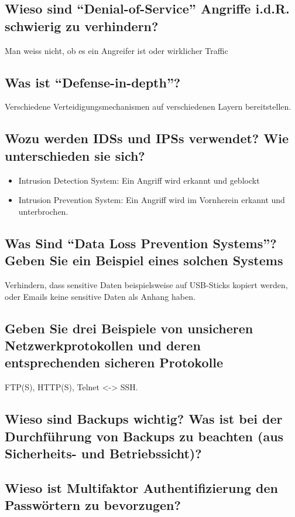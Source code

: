 \subsection*{Wieso sind "`Denial-of-Service"' Angriffe i.d.R. schwierig zu verhindern?}
Man weiss nicht, ob es ein Angreifer ist oder wirklicher Traffic

\subsection*{Was ist "`Defense-in-depth"'?}
Verschiedene Verteidigungsmechanismen auf verschiedenen Layern bereitstellen.

\subsection*{Wozu werden IDSs und IPSs verwendet? Wie unterschieden sie sich?}
\begin{itemize}
    \item Intrusion Detection System: Ein Angriff wird erkannt und geblockt
    \item Intrusion Prevention System: Ein Angriff wird im Vornherein erkannt und unterbrochen.
\end{itemize}

\subsection*{Was Sind "`Data Loss Prevention Systems"'? Geben Sie ein Beispiel eines solchen Systems}
Verhindern, dass sensitive Daten beispielsweise auf USB-Sticks kopiert werden, oder Emails keine sensitive Daten als Anhang haben.

\subsection*{Geben Sie drei Beispiele von unsicheren Netzwerkprotokollen und deren entsprechenden sicheren Protokolle}
FTP(S), HTTP(S), Telnet <-> SSH.

\subsection*{Wieso sind Backups wichtig? Was ist bei der Durchführung von Backups zu beachten (aus Sicherheits- und Betriebssicht)?}
\subsection*{Wieso ist Multifaktor Authentifizierung den Passwörtern zu bevorzugen?}
